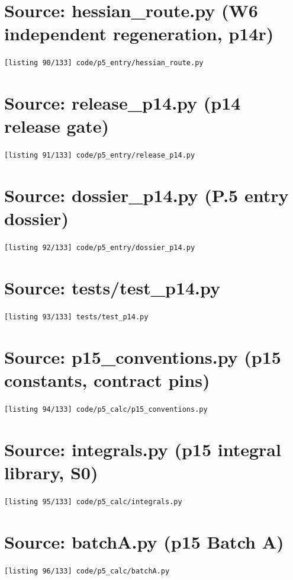 \section{Source: hessian\_route.py (W6 independent regeneration, p14r)}
\noindent\texttt{[listing 90/133] code/p5\_entry/hessian\_route.py}
{\scriptsize}

\section{Source: release\_p14.py (p14 release gate)}
\noindent\texttt{[listing 91/133] code/p5\_entry/release\_p14.py}
{\scriptsize}

\section{Source: dossier\_p14.py (P.5 entry dossier)}
\noindent\texttt{[listing 92/133] code/p5\_entry/dossier\_p14.py}
{\scriptsize}

\section{Source: tests/test\_p14.py}
\noindent\texttt{[listing 93/133] tests/test\_p14.py}
{\scriptsize}

\section{Source: p15\_conventions.py (p15 constants, contract pins)}
\noindent\texttt{[listing 94/133] code/p5\_calc/p15\_conventions.py}
{\scriptsize}

\section{Source: integrals.py (p15 integral library, S0)}
\noindent\texttt{[listing 95/133] code/p5\_calc/integrals.py}
{\scriptsize}

\section{Source: batchA.py (p15 Batch A)}
\noindent\texttt{[listing 96/133] code/p5\_calc/batchA.py}
{\scriptsize}

